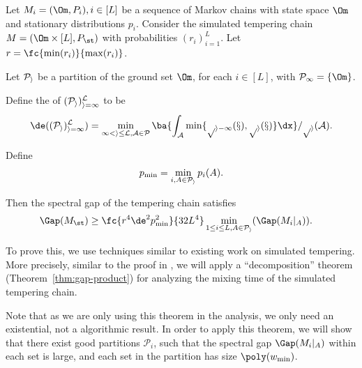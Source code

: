 \begin{thm*}
Let $M_i=(\Om, P_i), i\in [L]$ be a sequence of Markov chains with state space $\Om$ and stationary distributions $p_i$.
Consider the simulated tempering chain $M=(\Om\times[L], P_{\st})$ %
 with probabilities $(r_i)_{i=1}^{L}$. Let $r = \fc{\min(r_i)}{\max(r_i)}$.  

Let $\cal P_i$
be a partition %
of the ground set $\Om$, for each $i\in [L]$, with $\cal P_1=\{\Om\}$. 

Define the  of $(\cal P_i)_{i=1}^L$ to be 
$$
\de((\cal P_i)_{i=1}^L) = \min_{1< i\le L, A\in \cal P} \ba{
\int_{A} \min\{p_{i-1}(x),p_i(x)\} \dx 
}/p_i(A).
$$

Define
$$
p_{\min}=\min_{i,A\in \cal P_i} p_i(A). 
$$

Then the spectral gap of the tempering chain  satisfies
\begin{align}
\Gap(M_{\st}) &\ge\fc{r^4\de^2p_{\min}^2}{32L^4}
\min_{1\le i\le L, A\in \cal P_i} (\Gap(M_{i}|_A)).
\end{align} 
\end{thm*} 
To prove this, we use techniques similar to existing work on  simulated tempering. %
More precisely, similar to the proof in \cite{woodard2009conditions}, we will apply a 
``decomposition'' theorem (Theorem~\ref{thm:gap-product}) for analyzing the mixing time of the simulated tempering chain.

Note that as we are only using this theorem in the analysis, we only need an existential, not a algorithmic result. 
In order to apply this theorem, we will show that there exist good partitions $\mathcal{P}_i$, such that the spectral gap $\Gap(M_{i}|_A)$ within each set is large, and each set in the partition has size $\poly(w_{\min})$. 

